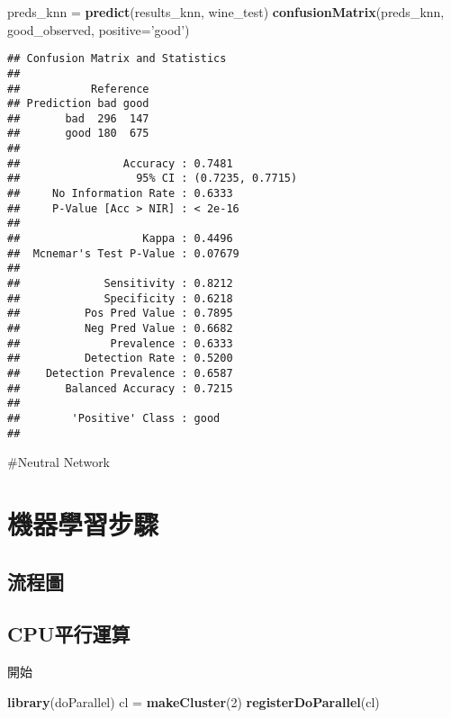 \documentclass[]{book}
\newenvironment{Shaded}{\begin{snugshade}}{\end{snugshade}}
\newcommand{\KeywordTok}[1]{\textcolor[rgb]{0.13,0.29,0.53}{\textbf{#1}}}
\newcommand{\DataTypeTok}[1]{\textcolor[rgb]{0.13,0.29,0.53}{#1}}
\newcommand{\DecValTok}[1]{\textcolor[rgb]{0.00,0.00,0.81}{#1}}
\newcommand{\StringTok}[1]{\textcolor[rgb]{0.31,0.60,0.02}{#1}}
\newcommand{\NormalTok}[1]{#1}
\begin{document}
\begin{Shaded}
\begin{Highlighting}[]
\NormalTok{preds_knn =}\StringTok{ }\KeywordTok{predict}\NormalTok{(results_knn, wine_test)}
\KeywordTok{confusionMatrix}\NormalTok{(preds_knn, good_observed, }\DataTypeTok{positive=}\StringTok{'good'}\NormalTok{)}
\end{Highlighting}
\end{Shaded}

\begin{verbatim}
## Confusion Matrix and Statistics
## 
##           Reference
## Prediction bad good
##       bad  296  147
##       good 180  675
##                                           
##                Accuracy : 0.7481          
##                  95% CI : (0.7235, 0.7715)
##     No Information Rate : 0.6333          
##     P-Value [Acc > NIR] : < 2e-16         
##                                           
##                   Kappa : 0.4496          
##  Mcnemar's Test P-Value : 0.07679         
##                                           
##             Sensitivity : 0.8212          
##             Specificity : 0.6218          
##          Pos Pred Value : 0.7895          
##          Neg Pred Value : 0.6682          
##              Prevalence : 0.6333          
##          Detection Rate : 0.5200          
##    Detection Prevalence : 0.6587          
##       Balanced Accuracy : 0.7215          
##                                           
##        'Positive' Class : good            
## 
\end{verbatim}

\#Neutral Network

\section{機器學習步驟}

\subsection{流程圖}

\hypertarget{cpu}{%
\subsection{CPU平行運算}\label{cpu}}

開始

\begin{Shaded}
\begin{Highlighting}[]
\KeywordTok{library}\NormalTok{(doParallel)}
\NormalTok{cl =}\StringTok{ }\KeywordTok{makeCluster}\NormalTok{(}\DecValTok{2}\NormalTok{)}
\KeywordTok{registerDoParallel}\NormalTok{(cl)}
\end{Highlighting}
\end{Shaded}
\end{document}
